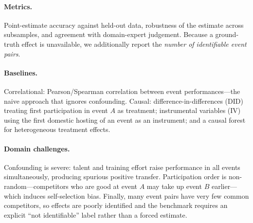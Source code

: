 \paragraph{Metrics.}
Point-estimate accuracy against held-out data, robustness of the estimate
across subsamples, and agreement with domain-expert judgement. Because a
ground-truth effect is unavailable, we additionally report the
\emph{number of identifiable event pairs}.

\paragraph{Baselines.}
Correlational: Pearson/Spearman correlation between event performances---the
naive approach that ignores confounding. Causal: difference-in-differences
(DID) \citep{did} treating first participation in event $A$ as treatment;
instrumental variables (IV) \citep{iv} using the first domestic hosting of an
event as an instrument; and a causal forest \citep{causal_forest} for
heterogeneous treatment effects.

\paragraph{Domain challenges.}
Confounding is severe: talent and training effort raise performance in all
events simultaneously, producing spurious positive transfer. Participation
order is non-random---competitors who are good at event $A$ may take up event
$B$ earlier---which induces self-selection bias. Finally, many event pairs have
very few common competitors, so effects are poorly identified and the benchmark
requires an explicit ``not identifiable'' label rather than a forced estimate.

